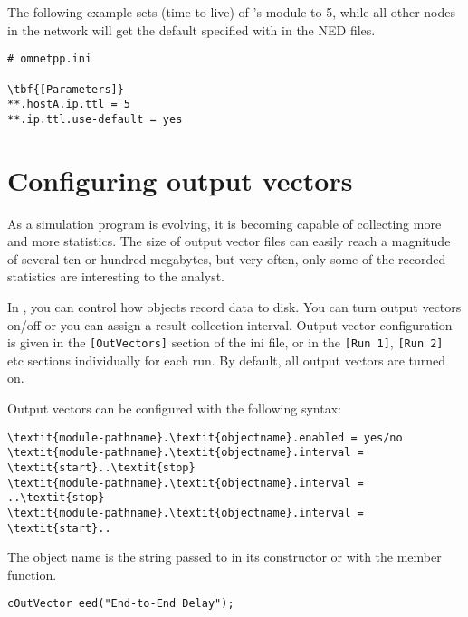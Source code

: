 The following example sets  (time-to-live) of 's
 module to 5, while all other nodes in the network
will get the default specified with  in the NED files.

\begin{Verbatim}[commandchars=\\\{\}]
# omnetpp.ini

\tbf{[Parameters]}
**.hostA.ip.ttl = 5
**.ip.ttl.use-default = yes
\end{Verbatim}



\section{Configuring output vectors}
\label{sec:ch-run-sim:outvectors}

As a simulation program is evolving, it is becoming capable of
collecting more and more statistics. The size of output vector
files can easily reach a magnitude of
several ten or hundred megabytes, but very often, only some of the
recorded statistics are interesting to the analyst.

In {\opp}, you can control how  objects record data
to disk. You can turn output vectors on/off or you can assign a result
collection interval. Output vector configuration is given in the
\texttt{[OutVectors]} section of the ini file, or in the \texttt{[Run
  1]}, \texttt{[Run 2]} etc sections individually for each run. By
default, all output vectors are turned on.

Output vectors can be configured with the following syntax:

\begin{Verbatim}[commandchars=\\\{\}]
\textit{module-pathname}.\textit{objectname}.enabled = yes/no
\textit{module-pathname}.\textit{objectname}.interval = \textit{start}..\textit{stop}
\textit{module-pathname}.\textit{objectname}.interval = ..\textit{stop}
\textit{module-pathname}.\textit{objectname}.interval = \textit{start}..
\end{Verbatim}

The object name is the string passed to  in its constructor
or with the  member function.

\begin{verbatim}
cOutVector eed("End-to-End Delay");
\end{verbatim}

